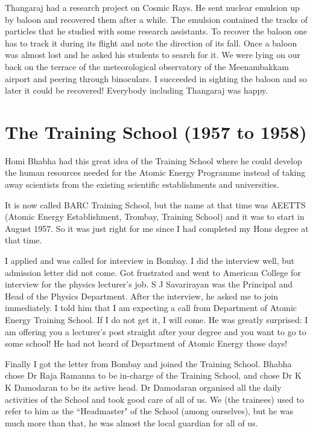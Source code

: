 Thangaraj had a research project on Cosmic Rays. He sent nuclear 
emulsion up by baloon and recovered them after a while. The emulsion 
contained the tracks of particles that he studied with some research 
assistants. To recover the baloon one has to track it during its flight 
and note the direction of its fall. Once a baloon was almost lost and he 
asked his students to search for it. We were lying on our back on the 
terrace of the meteorological observatory of the Meenambakkam airport 
and peering through binoculars. I succeeded in sighting the baloon and 
so later it could be recovered! Everybody including Thangaraj was happy.

\vspace{-.3cm}

\section*{The Training School (1957 to 1958)}

\vspace{-.2cm}

Homi Bhabha had this great idea of the Training School where he could develop the human resources needed for the Atomic Energy Programme instead of taking away scientists from the existing scientific establishments and universities.   

It is now called BARC Training School, but the name at that time was AEETTS (Atomic Energy Establishment, Trombay, Trai\-ning School) and it was to start in August 1957. So it was just right for me since I had completed my Hons degree at that time.

I applied and was called for interview in Bombay. I did the interview 
well, but admission letter did not come. Got frustrated and went to 
American College for interview for the physics lecturer's job. S J 
Savarirayan was the Principal and Head of the Physics Department. After 
the interview, he asked me to join immedi\-ately. I told him that I am 
expecting a call from Department of Atomic Energy Training School. If I 
do not get it, I will come. He was greatly surprised: I am offering you 
a lecturer's post straight after your degree and you want to go to some 
sch\-ool! He had not heard of Department of Atomic Energy those days! 

\newpage

Finally I got the letter from Bombay and joined the Trai\-ning School. Bhabha chose Dr Raja Ramanna to be in-charge of the Training School, and chose Dr K K Damodaran to be its active head. Dr Damodaran organised all the daily activities of the School and took good care of all of us. We (the trainees) used to refer to him as the ``Headmaster" of the School (among ourselves), but he was much more than that, he was almost the local guardian for all of us.
 
